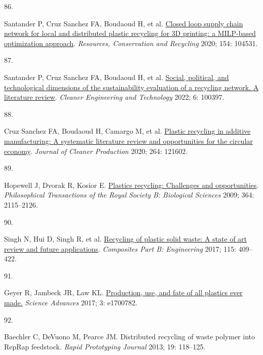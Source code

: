 \documentclass[
  12pt,
  a4paperpaper,
  onecolumn]{article}
\newlength{\cslhangindent}
\newlength{\csllabelwidth}
\newlength{\cslentryspacingunit} %
\newenvironment{CSLReferences}[2] %
 {%
  \setlength{\parindent}{0pt}
  \ifodd #1
  \let\oldpar\par
  \def\par{\hangindent=\cslhangindent\oldpar}
  \fi
  \setlength{\parskip}{#2\cslentryspacingunit}
 }%
 {}
\newcommand{\CSLLeftMargin}[1]{\parbox[t]{\csllabelwidth}{#1}}
\newcommand{\CSLRightInline}[1]{\parbox[t]{\linewidth - \csllabelwidth}{#1}\break}
\begin{document}
\begin{CSLReferences}{0}{0}
\leavevmode{}%
\CSLLeftMargin{86. }%
\CSLRightInline{Santander P, Cruz Sanchez FA, Boudaoud H, et al.
\href{https://doi.org/10.1016/j.resconrec.2019.104531}{{Closed loop
supply chain network for local and distributed plastic recycling for 3D
printing: a MILP-based optimization approach}}. \emph{Resources,
Conservation and Recycling} 2020; 154: 104531.}

\leavevmode{}%
\CSLLeftMargin{87. }%
\CSLRightInline{Santander P, Cruz Sanchez FA, Boudaoud H, et al.
\href{https://doi.org/10.1016/j.clet.2022.100397}{Social, political, and
technological dimensions of the sustainability evaluation of a recycling
network. {A} literature review}. \emph{Cleaner Engineering and
Technology} 2022; 6: 100397.}

\leavevmode{}%
\CSLLeftMargin{88. }%
\CSLRightInline{Cruz Sanchez FA, Boudaoud H, Camargo M, et al.
\href{https://doi.org/10.1016/j.jclepro.2020.121602}{Plastic recycling
in additive manufacturing: {A} systematic literature review and
opportunities for the circular economy}. \emph{Journal of Cleaner
Production} 2020; 264: 121602.}

\leavevmode{}%
\CSLLeftMargin{89. }%
\CSLRightInline{Hopewell J, Dvorak R, Kosior E.
\href{https://doi.org/10.1098/rstb.2008.0311}{Plastics recycling:
Challenges and opportunities}. \emph{Philosophical Transactions of the
Royal Society B: Biological Sciences} 2009; 364: 2115--2126.}

\leavevmode{}%
\CSLLeftMargin{90. }%
\CSLRightInline{Singh N, Hui D, Singh R, et al.
\href{https://doi.org/10.1016/j.compositesb.2016.09.013}{Recycling of
plastic solid waste: {A} state of art review and future applications}.
\emph{Composites Part B: Engineering} 2017; 115: 409--422.}

\leavevmode{}%
\CSLLeftMargin{91. }%
\CSLRightInline{Geyer R, Jambeck JR, Law KL.
\href{https://doi.org/10.1126/sciadv.1700782}{Production, use, and fate
of all plastics ever made.} \emph{Science Advances} 2017; 3: e1700782.}

\leavevmode{}%
\CSLLeftMargin{92. }%
\CSLRightInline{Baechler C, DeVuono M, Pearce JM. {Distributed recycling
of waste polymer into RepRap feedstock}. \emph{Rapid Prototyping
Journal} 2013; 19: 118--125.}


\end{CSLReferences}
\end{document}
